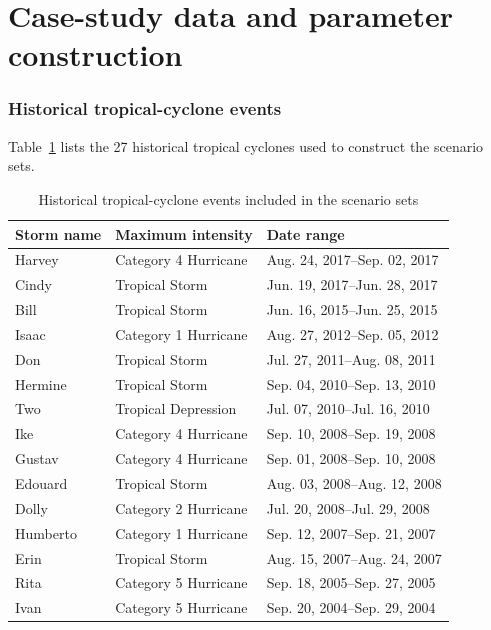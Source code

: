 \documentclass[preprint,11pt,authoryear]{elsarticle}
\begin{document}
\section{Case-study data and parameter construction}
\label{sec:supp_case_study}

\subsubsection{Historical tropical-cyclone events}
\label{sec:supp_tc_events}

Table~\ref{tbl:supp_tc_events} lists the 27 historical tropical cyclones used to construct the scenario sets.

\begin{table}[H]
\centering
\caption{Historical tropical-cyclone events included in the scenario sets
\citep{Tabassum2024Dissertation}}
\label{tbl:supp_tc_events}
\small
\begin{tabular}{lll}
\toprule
Storm name & Maximum intensity & Date range\\
\midrule
Harvey & Category 4 Hurricane & Aug. 24, 2017--Sep. 02, 2017\\
Cindy & Tropical Storm & Jun. 19, 2017--Jun. 28, 2017\\
Bill & Tropical Storm & Jun. 16, 2015--Jun. 25, 2015\\
Isaac & Category 1 Hurricane & Aug. 27, 2012--Sep. 05, 2012\\
Don & Tropical Storm & Jul. 27, 2011--Aug. 08, 2011\\
Hermine & Tropical Storm & Sep. 04, 2010--Sep. 13, 2010\\
Two & Tropical Depression & Jul. 07, 2010--Jul. 16, 2010\\
Ike & Category 4 Hurricane & Sep. 10, 2008--Sep. 19, 2008\\
Gustav & Category 4 Hurricane & Sep. 01, 2008--Sep. 10, 2008\\
Edouard & Tropical Storm & Aug. 03, 2008--Aug. 12, 2008\\
Dolly & Category 2 Hurricane & Jul. 20, 2008--Jul. 29, 2008\\
Humberto & Category 1 Hurricane & Sep. 12, 2007--Sep. 21, 2007\\
Erin & Tropical Storm & Aug. 15, 2007--Aug. 24, 2007\\
Rita & Category 5 Hurricane & Sep. 18, 2005--Sep. 27, 2005\\
Ivan & Category 5 Hurricane & Sep. 20, 2004--Sep. 29, 2004\\

\end{tabular}
\end{table}
\end{document}
